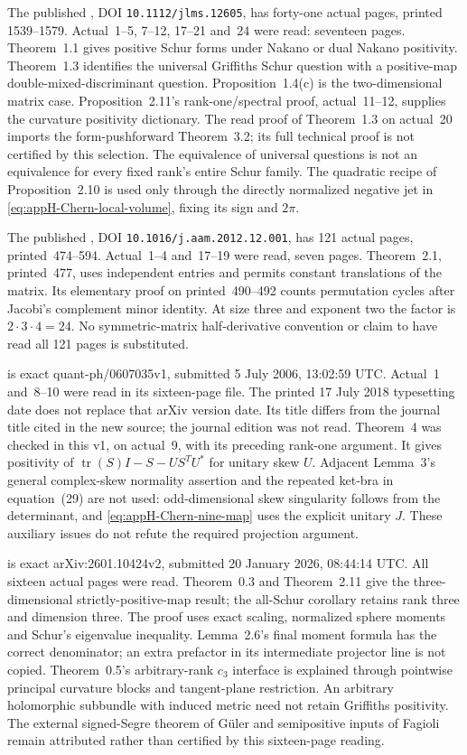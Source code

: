 The published \cite{Finski22CharacteristicPublished}, DOI
\nolinkurl{10.1112/jlms.12605}, has forty-one actual pages, printed
1539--1579. Actual~1--5, 7--12, 17--21 and~24 were read:
seventeen pages. Theorem~1.1 gives positive Schur forms under
Nakano or dual Nakano positivity. Theorem~1.3 identifies the
universal Griffiths Schur question with a positive-map
double-mixed-discriminant question. Proposition~1.4(c) is the
two-dimensional matrix case. Proposition~2.11's rank-one/spectral
proof, actual~11--12, supplies the curvature positivity dictionary.
The read proof of Theorem~1.3 on actual~20 imports the form-pushforward
Theorem~3.2; its full technical proof is not certified by this selection.
The equivalence of universal questions is not an equivalence for
every fixed rank's entire Schur family. The quadratic recipe of
Proposition~2.10 is used only through the directly normalized negative
jet in \eqref{eq:appH-Chern-local-volume}, fixing its sign and $2\pi$.

The published \cite{CaraccioloSokalSportiello13CayleyPublished}, DOI
\nolinkurl{10.1016/j.aam.2012.12.001}, has 121 actual pages,
printed~474--594. Actual~1--4 and~17--19 were read, seven pages.
Theorem~2.1, printed~477, uses independent entries and permits
constant translations of the matrix. Its elementary proof on
printed~490--492 counts permutation cycles after Jacobi's complement
minor identity. At size three and exponent two the factor is
$2\cdot3\cdot4=24$. No symmetric-matrix half-derivative convention
or claim to have read all 121 pages is substituted.

\cite{Hall06PositiveMapsV1} is exact quant-ph/0607035v1, submitted
5 July 2006, 13:02:59 UTC. Actual~1 and~8--10 were read in its
sixteen-page file. The printed 17 July 2018 typesetting date does
not replace that arXiv version date. Its title differs from the
journal title cited in the new source; the journal edition was
not read. Theorem~4 was checked in this v1, on actual~9, with
its preceding rank-one argument. It gives positivity of
$\operatorname{tr}(S)I-S-US^TU^*$ for unitary skew $U$.
Adjacent Lemma~3's general complex-skew normality assertion and
the repeated ket-bra in equation~(29) are not used: odd-dimensional
skew singularity follows from the determinant, and
\eqref{eq:appH-Chern-nine-map} uses the explicit unitary $J$.
These auxiliary issues do not refute the required projection argument.

\cite{Wan26ThirdChernV2} is exact arXiv:2601.10424v2,
submitted 20 January 2026, 08:44:14 UTC. All sixteen actual pages
were read. Theorem~0.3 and Theorem~2.11 give the three-dimensional
strictly-positive-map result; the all-Schur corollary retains
rank three and dimension three. The proof uses exact scaling,
normalized sphere moments and Schur's eigenvalue inequality.
Lemma~2.6's final moment formula has the correct denominator;
an extra prefactor in its intermediate projector line is not copied.
Theorem~0.5's arbitrary-rank $c_3$ interface is explained through
pointwise principal curvature blocks and tangent-plane restriction.
An arbitrary holomorphic subbundle with induced metric need not
retain Griffiths positivity. The external signed-Segre theorem of
G\"uler and semipositive inputs of Fagioli remain attributed rather
than certified by this sixteen-page reading.

